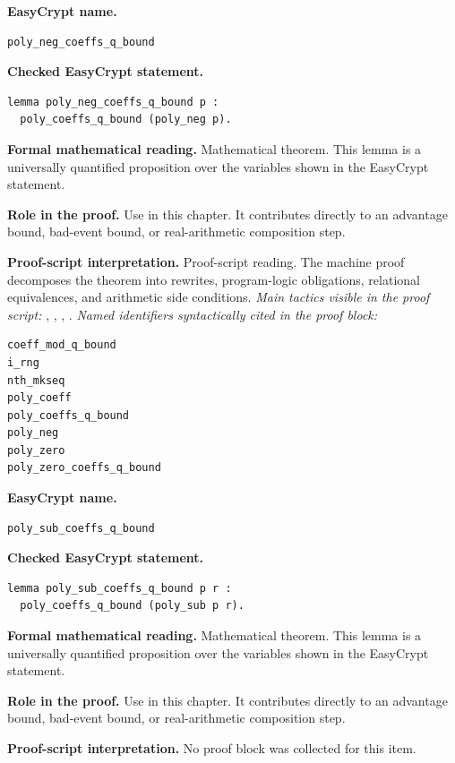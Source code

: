 \begin{formaltheorem}
\noindent\textbf{EasyCrypt name.}
\begin{lstlisting}[language=EasyCrypt,basicstyle=\ttfamily\scriptsize]
poly_neg_coeffs_q_bound
\end{lstlisting}
\noindent\textbf{Checked EasyCrypt statement.}
\begin{lstlisting}[language=EasyCrypt,basicstyle=\ttfamily\scriptsize]
lemma poly_neg_coeffs_q_bound p :
  poly_coeffs_q_bound (poly_neg p).
\end{lstlisting}
\noindent\textbf{Formal mathematical reading.}
Mathematical theorem. This lemma is a universally quantified proposition over the variables shown in the EasyCrypt statement.

\noindent\textbf{Role in the proof.}
Use in this chapter. It contributes directly to an advantage bound, bad-event bound, or real-arithmetic composition step.

\noindent\textbf{Proof-script interpretation.}
Proof-script reading. The machine proof decomposes the theorem into rewrites, program-logic obligations, relational equivalences, and arithmetic side conditions.
\emph{Main tactics visible in the proof script:} , , , .
\emph{Named identifiers syntactically cited in the proof block:}
\begin{lstlisting}[language=EasyCrypt,basicstyle=\ttfamily\scriptsize]
coeff_mod_q_bound
i_rng
nth_mkseq
poly_coeff
poly_coeffs_q_bound
poly_neg
poly_zero
poly_zero_coeffs_q_bound
\end{lstlisting}

\end{formaltheorem}

\begin{formaltheorem}
\noindent\textbf{EasyCrypt name.}
\begin{lstlisting}[language=EasyCrypt,basicstyle=\ttfamily\scriptsize]
poly_sub_coeffs_q_bound
\end{lstlisting}
\noindent\textbf{Checked EasyCrypt statement.}
\begin{lstlisting}[language=EasyCrypt,basicstyle=\ttfamily\scriptsize]
lemma poly_sub_coeffs_q_bound p r :
  poly_coeffs_q_bound (poly_sub p r).
\end{lstlisting}
\noindent\textbf{Formal mathematical reading.}
Mathematical theorem. This lemma is a universally quantified proposition over the variables shown in the EasyCrypt statement.

\noindent\textbf{Role in the proof.}
Use in this chapter. It contributes directly to an advantage bound, bad-event bound, or real-arithmetic composition step.

\noindent\textbf{Proof-script interpretation.}
No proof block was collected for this item.

\end{formaltheorem}

